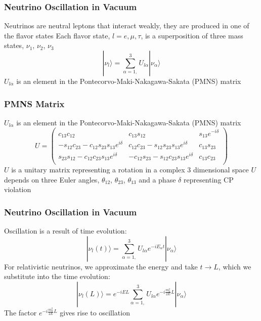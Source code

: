 \documentclass[10pt,professionalfonts,xcolor=table]{beamer}
\begin{document}
\frame
{
  \frametitle{Neutrino Oscillation in Vacuum}
  \begin{itemize}
  \bang Neutrinos are neutral leptons that interact weakly, they are produced in one of the flavor states
  \gap
  \bang Each flavor state, $l=e,\mu,\tau$,  is a superposition of three mass states, $\nu_1$, $\nu_2$, $\nu_3$
  \gap
  \begin{equation*}
|\nu_l \rangle = \sum_{\alpha = 1,}^3 U_{l\alpha}|\nu_\alpha \rangle
  \end{equation*}
  \gap
  \bang $U_{l\alpha}$ is an element in the Pontecorvo-Maki-Nakagawa-Sakata (PMNS) matrix
  \end{itemize}

}


\frame
{
  \frametitle{PMNS Matrix}
  \begin{itemize}
  \bang $U_{l\alpha}$ is an element in the Pontecorvo-Maki-Nakagawa-Sakata (PMNS) matrix
  \begin{equation*}
 U = \begin{pmatrix} \label{pmns}
c_{13}c_{12}              &    c_{13}s_{12} 	   	 & 		s_{13} e^{-i\delta} \\
-s_{12}c_{23} - c_{12}s_{23}s_{13}e^{i\delta}	& c_{12}c_{23} - s_{12}s_{23}s_{13}e^{i\delta} 				& 		c_{13}s_{23}  \\
s_{23}s_{12} - c_{12}c_{23}s_{13}e^{i\delta}	& -c_{12}s_{23} - s_{12}c_{23}s_{13}e^{i\delta} 				& 		c_{13}c_{23}  \\
\end{pmatrix}
\end{equation*}
\gap
\bang $U$ is a unitary matrix representing a rotation in a complex 3 dimensional space
\gap
\bang $U$ depends on three Euler angles, $\theta_{12}$, $\theta_{23}$, $\theta_{13}$ and a phase $\delta$ representing CP violation
  \end{itemize}
}

\frame
{
  \frametitle{Neutrino Oscillation in Vacuum}
  \begin{itemize}
	\bang Oscillation is a result of time evolution:
	\begin{equation*}
		|\nu_l(t) \rangle = \sum_{\alpha = 1,}^3 U_{l\alpha}e^{-iE_\alpha t}|\nu_\alpha \rangle
	\end{equation*}
	\bang For relativistic neutrinos, we approximate the energy and take $t \rightarrow L$, which we substitute into the time evolution:
	\begin{equation*}
		|\nu_l(L) \rangle = e^{-iEL} \sum_{\alpha = 1,}^3 U_{l\alpha}e^{-i\frac{m_\alpha^2}{2E} L}|\nu_\alpha \rangle
	\end{equation*}
  \gap
	\bang The factor $e^{-i\frac{m_\alpha^2}{2E} L}$ gives rise to oscillation


  \end{itemize}
}
\end{document}
